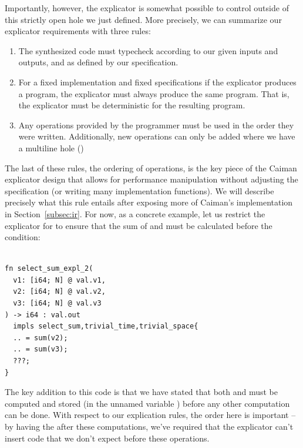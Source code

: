 Importantly, however, the explicator is somewhat possible to control outside of this strictly open  hole we just defined.  More precisely, we can summarize our explicator requirements with three rules:
%
\begin{enumerate}
\item The synthesized code must typecheck according to our given inputs and outputs, and as defined by our specification.
\item For a fixed implementation and fixed specifications if the explicator produces a program, the explicator must always produce the same program.  That is, the explicator must be deterministic for the resulting program.
\item Any operations provided by the programmer must be used in the order they were written.  Additionally, new operations can only be added where we have a multiline hole ()
\end{enumerate}
%
The last of these rules, the ordering of operations, is the key piece of the Caiman explicator design that allows for performance manipulation without adjusting the specification (or writing many implementation functions).  We will describe precisely what this rule entails after exposing more of Caiman's implementation in Section~\ref{subsec:ir}.  For now, as a concrete example, let us restrict the explicator for  to ensure that the sum of  and  must be calculated before the condition:
%
\begin{lstlisting}

fn select_sum_expl_2(
  v1: [i64; N] @ val.v1,
  v2: [i64; N] @ val.v2,
  v3: [i64; N] @ val.v3
) -> i64 : val.out 
  impls select_sum,trivial_time,trivial_space{
  .. = sum(v2);
  .. = sum(v3);
  ???;
}
\end{lstlisting}
%
The key addition to this code is that we have stated that both  and  must be computed and stored (in the unnamed variable ) before any other computation can be done.  With respect to our explication rules, the order here is important -- by having the  after these computations, we've required that the explicator can't insert code that we don't expect before these operations.

